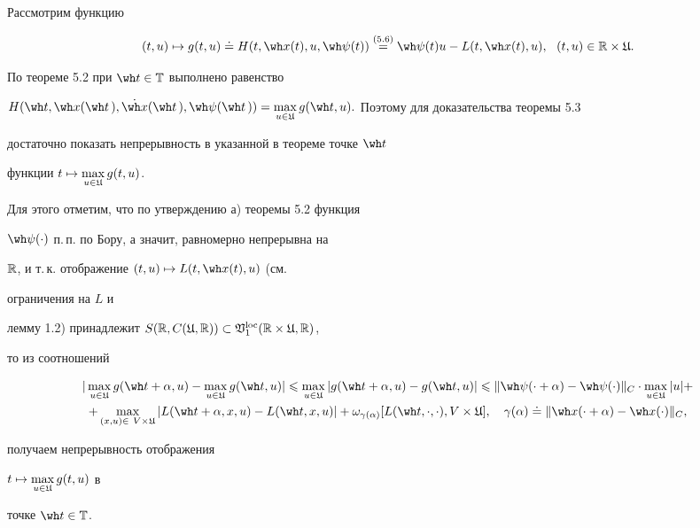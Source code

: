 \begin{pf}


Рассмотрим функцию


$$


(t,u)\mapsto g(t,u)\doteq H(t,\wh x(t),u,\wh\psi(t))


\up{(5.6)}{=}{}\wh\psi(t)u


-L(t,\wh x(t),u),\ \ (t,u)\in\Bbb R\times\frak U.


$$


По теореме 5.2 при $\wh t\in\Bbb T$ выполнено равенство


${H(\wh t,\wh x(\wh t\,),\dot{\wh x}(\wh t\,),\wh\psi(\wh t\,))=


\max\limits_{u\in\frak U}g(\wh t,u).}$ Поэтому для доказательства теоремы 5.3


достаточно показать непрерывность в указанной в теореме точке $\wh t$


функции $t\mapsto\max\limits_{u\in\frak U}g(t,u)$.


Для этого отметим, что по утверждению а) теоремы 5.2 функция


$\wh\psi(\cdot)$ п.\,п. по Бору, а значит, равномерно непрерывна на


$\Bbb R$, и т.\,к. отображение $(t,u)\mapsto L(t,\wh x(t),u)$ (см. 


ограничения на $L$ и


лемму 1.2) принадлежит $S(\Bbb R,C(\frak U,\Bbb


R))\subset\frak V_1^{\loc}(\Bbb R\times\frak U,\Bbb R)$,


то из соотношений


\begin{multline*}


|\max\limits_{u\in{\frak U}}g(\wh t+\alpha,u)-


\max\limits_{u\in{\frak U}}g(\wh t,u)|\leqslant


\max\limits_{u\in{\frak U}}|g(\wh t+\alpha,u)-g(\wh


t,u)|\leqslant \|\wh\psi(\cdot+\alpha)-


\wh\psi(\cdot)\|_{C}\cdot\max\limits_{u\in{\frak U}}|u|+ \\


%


+\max\limits_{(x,u)\in\ V\times{\frak U}}


|L(\wh t+\alpha,x,u)-L(\wh t,x,u)|+ 


\omega_{\gamma(\alpha)}[L(\wh


t,\cdot,\cdot),V\times{\frak U}],


\quad \gamma(\alpha)\doteq \|\wh x(\cdot+\alpha)-\wh


x(\cdot)\|_{C},


\end{multline*}


получаем непрерывность отображения


$t\mapsto\max\limits_{u\in{\frak U}}g(t,u)$ в


точке $\wh t\in{\Bbb T}$.


\end{pf}





